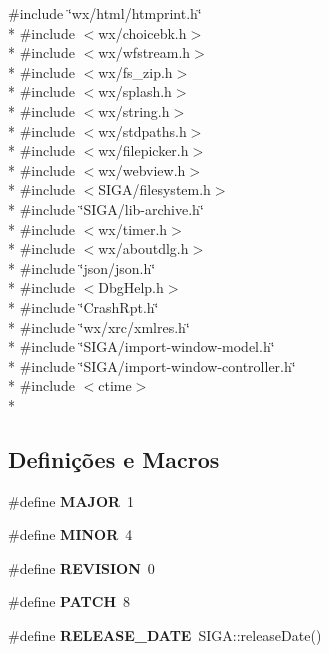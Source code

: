 {\ttfamily \#include \char`\"{}wx/html/htmprint.\+h\char`\"{}}\\*
{\ttfamily \#include $<$wx/choicebk.\+h$>$}\\*
{\ttfamily \#include $<$wx/wfstream.\+h$>$}\\*
{\ttfamily \#include $<$wx/fs\+\_\+zip.\+h$>$}\\*
{\ttfamily \#include $<$wx/splash.\+h$>$}\\*
{\ttfamily \#include $<$wx/string.\+h$>$}\\*
{\ttfamily \#include $<$wx/stdpaths.\+h$>$}\\*
{\ttfamily \#include $<$wx/filepicker.\+h$>$}\\*
{\ttfamily \#include $<$wx/webview.\+h$>$}\\*
{\ttfamily \#include $<$S\+I\+G\+A/filesystem.\+h$>$}\\*
{\ttfamily \#include \char`\"{}S\+I\+G\+A/lib-\/archive.\+h\char`\"{}}\\*
{\ttfamily \#include $<$wx/timer.\+h$>$}\\*
{\ttfamily \#include $<$wx/aboutdlg.\+h$>$}\\*
{\ttfamily \#include \char`\"{}json/json.\+h\char`\"{}}\\*
{\ttfamily \#include $<$Dbg\+Help.\+h$>$}\\*
{\ttfamily \#include \char`\"{}Crash\+Rpt.\+h\char`\"{}}\\*
{\ttfamily \#include \char`\"{}wx/xrc/xmlres.\+h\char`\"{}}\\*
{\ttfamily \#include \char`\"{}S\+I\+G\+A/import-\/window-\/model.\+h\char`\"{}}\\*
{\ttfamily \#include \char`\"{}S\+I\+G\+A/import-\/window-\/controller.\+h\char`\"{}}\\*
{\ttfamily \#include $<$ctime$>$}\\*
\subsection*{Definições e Macros}
\begin{DoxyCompactItemize}
\item 
\#define {\bf M\+A\+J\+OR}~1
\item 
\#define {\bf M\+I\+N\+OR}~4
\item 
\#define {\bf R\+E\+V\+I\+S\+I\+ON}~0
\item 
\#define {\bf P\+A\+T\+CH}~8
\item 
\#define {\bf R\+E\+L\+E\+A\+S\+E\+\_\+\+D\+A\+TE}~S\+I\+G\+A\+::release\+Date()
\end{DoxyCompactItemize}
